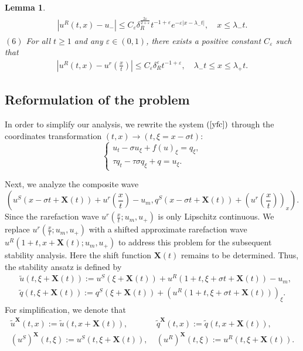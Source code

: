 \documentclass[10pt,reqno]{amsart}
\numberwithin{equation}{section}
\newtheorem{lemma}[theorem]{Lemma}
\begin{document}
\begin{lemma}
\begin{align*}
\begin{array}{l}
				\left|u^{R}(t, x)-u_{-}\right| \leq C_{\varepsilon} \delta_{R}^{\frac{2 \varepsilon}{2+\varepsilon}} t^{-1+\varepsilon} e^{-\varepsilon\left|x-\lambda_{-} t\right|}, \quad x \leq \lambda_{-} t.
			\end{array}
		\end{align*}
		$(6)$ For all \( t \geq 1 \) and any \( \varepsilon \in(0,1) \), there exists a positive constant \( C_{\varepsilon} \) such that
		\begin{align*}
			\left|u^{R}(t, x)-u^{r}\left(\frac{x}{t}\right)\right| \leq C_{\varepsilon} \delta_{R}^{\varepsilon} t^{-1+\varepsilon}, \quad \lambda_{-} t \leq x \leq \lambda_{+} t .
		\end{align*}
	\end{lemma}
	
	\subsection{Reformulation of the problem}
	In order to simplify our analysis, we rewrite the system $(\ref{yfc})$ through the coordinates transformation $(t,x)\to (t,\xi=x-\sigma t)$:
	\begin{equation} \label{TFC}
		\begin{cases}
			u_t - \sigma u_{\xi} + f(u)_{\xi} = q_{\xi}, \\
			\tau q_t - \tau\sigma q_{\xi} + q = u_{\xi}.
		\end{cases} 
	\end{equation}\par
	Next, we analyze the composite wave $$\left(u^S(x-\sigma t+\mathbf{X}(t))+u^r(\frac{x}{t})-u_{m}, q^S(x-\sigma t+\mathbf{X}(t))+\left(u^r(\frac{x}{t})\right)_{x}\right).$$ Since the rarefaction wave $u^r(\frac{x}{t};u_m,u_+)$ is only Lipschitz continuous. We replace $u^r(\frac{x}{t};u_m,u_+)$ with a shifted approximate rarefaction wave  $u^R(1+t,x+\mathbf{X}(t);u_m,u_+)$ to address this problem for the subsequent stability analysis. Here the shift function $\mathbf{X}(t)$ remains to be determined. Thus, the stability ansatz is defined by
	 \begin{align}
	 	&\tilde{u}(t,\xi+\mathbf{X}(t)):=u^S\left(\xi+\mathbf{X}(t)\right)+u^R\left(1+t,\xi+\sigma t+\mathbf{X}(t) \right)-u_m, \\
	 	&\tilde{q}(t,\xi+\mathbf{X}(t)):=q^{S}(\xi+\mathbf{X}(t))+\left(u^R\left(1+t,\xi+\sigma t+\mathbf{X}(t) \right)\right)_{\xi}.
	 \end{align}
	For simplification, we denote that
	\begin{align*}
		\tilde{u}^{\mathbf{X}}(t,x):=\tilde{u}(t,x+\mathbf{X}(t)),&\ \tilde{q}^{\mathbf{X}}(t,x):=\tilde{q}(t,x+\mathbf{X}(t)),\\
		\left(u^{S}\right)^{\mathbf{X}}(t,\xi):=u^{S}(t,\xi+\mathbf{X}(t)),&\ \left(u^{R}\right)^{\mathbf{X}}(t,\xi):=u^{R}(t,\xi+\mathbf{X}(t)).
	\end{align*}\par
\end{document}
